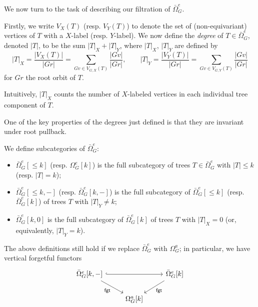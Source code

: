 \documentclass[a4paper,10pt]{article}%
\begin{document}
We now turn to the task of describing our filtration of $\bar{\Omega}_{G}^e$. 

Firstly, we write $V_X(T)$ (resp. $V_Y(T)$) to denote the set of (non-equivariant) vertices of $T$ with a $X$-label (resp. $Y$-label). 
We now define the \textit{degree} of $T \in \bar{\Omega}_{G}^e$,
denoted $|T|$, to be the sum $|T|_X + |T|_Y$, where $|T|_X$, $|T|_Y$ are defined by
\[
|T|_X = \dfrac{|V_X(T)|}{|G r|} = \sum\limits_{G v\in V_{G,X}(T)}\dfrac{|G v|}{|G r|},
\qquad
|T|_Y = \dfrac{|V_Y(T)|}{|G r|} = \sum\limits_{G v\in V_{G,Y}(T)}\dfrac{|G v|}{|G r|}
\]
for $G r$ the root orbit of $T$. 

Intuitively, $|T|_X$ counts the number of $X$-labeled vertices in each individual tree component of $T$.


\begin{remark}
  One of the key properties of the degrees just defined is that they are invariant under root pullback.
\end{remark}


\begin{definition}\label{TREE_FILTRATION_PIECES_DEFINITION}
  We define subcategories of $\bar{\Omega}_{G}^e$:
  \begin{itemize}
  \item $\bar{\Omega}_G^e[\leq k]$ (resp. $\Omega_G^e[k]$) is the full subcategory of trees 
    $T \in \bar{\Omega}_G^e$ with $|T|\leq k$ (resp. $|T| = k$);
  \item $\bar{\Omega}_G^e[\leq k,-]$ (resp. $\bar{\Omega}_G^e[k,-]$) is the full subcategory of $\bar{\Omega}_G^e[\leq k]$ (resp. $\bar{\Omega}_G^e[k]$) of trees $T$ with $|T|_{Y}\neq k$;
  \item $\bar{\Omega}_G^e[k,0]$ is the full subcategory of 
    $\bar{\Omega}_G^e[k]$ of trees $T$ with $|T|_X = 0$ (or, equivalently, $|T|_{Y} = k$).
  \end{itemize}
  The above definitions still hold if we replace $\bar\Omega_G^e$ with $\Omega_G^a$; in particular, we have vertical forgetful functors
  \[
  \begin{tikzcd}
    \bar\Omega_G^e[k,-] \arrow[dr, "\mathsf{fgt}"'] \arrow[rr, hookrightarrow] && \bar\Omega_G^e[k] \arrow[dl, "\mathsf{fgt}"]\\
    & \Omega_G^a[k]
  \end{tikzcd}
  \]
\end{definition}
\end{document}
